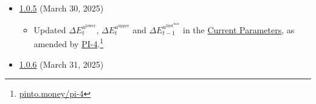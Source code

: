 \documentclass[class=article, crop=false]{standalone}
\begin{document}
\begin{itemize}[topsep=0pt, itemsep=3pt,leftmargin=16pt]
\begin{itemize}
        \item Updated $Q$ and $R^{D^{\text{lower}}}$ in the \hyperlink{subsection.12.1}{Current Parameters}, as amended by \href{https://pinto.money/pi-3}{PI-3}.
        \item Added $D^{F}$ and $f^{\mathscr{P}}(R_{t-1}^{D})$ to the \href{https://github.com/pinto-org/whitepaper/blob/master/version-history/pinto1_0_4.pdf}{Glossary}.
        \item Removed $D_{\gamma}$ and $D_{\gamma}^{F}$ from the \href{https://github.com/pinto-org/whitepaper/blob/master/version-history/pinto1_0_4.pdf}{Glossary}.
    \end{itemize}

    \item \href{https://github.com/pinto-org/whitepaper/blob/master/version-history/pinto1_0_5.pdf}{1.0.5} (March 30, 2025)
    
    \begin{itemize}
        \item Updated $\Delta E_{t}^{u^{\text{lower}}}$, $\Delta E_{t}^{u^{\text{upper}}}$ and $\Delta E_{t-1}^{u^{\text{first}^{\text{max}}}}$ in the \hyperlink{subsection.12.1}{Current Parameters}, as amended by \href{https://pinto.money/pi-4}{PI-4}.\footnote{\href{https://pinto.money/pi-4}{pinto.money/pi-4}}       
    \end{itemize}


    \item \href{https://github.com/pinto-org/whitepaper/blob/master/version-history/pinto1_0_6.pdf}{1.0.6} (March 31, 2025)
    

\end{itemize}
\end{document}
